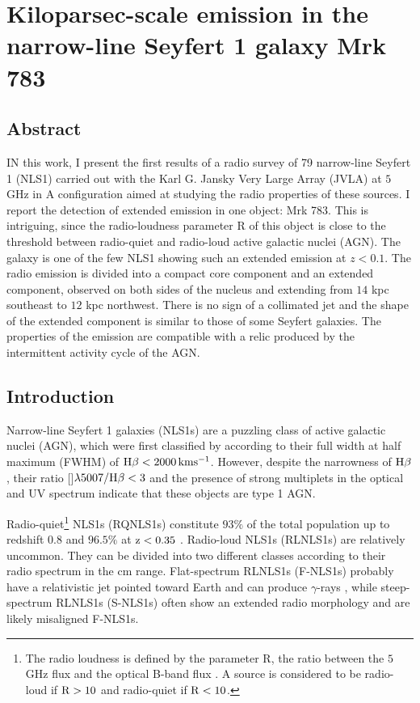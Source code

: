 \documentclass[../main.tex]{subfiles}
\begin{document}
\chapter[KSE in the NLS1 Mrk 783]{Kiloparsec-scale emission in the narrow-line Seyfert 1 galaxy Mrk 783}
\label{cap:paper2}

\section{Abstract}
IN this work, I present the first results of a radio survey of 79 narrow-line Seyfert 1 (NLS1) carried out with the Karl G. Jansky Very Large Array (JVLA) at $5$ GHz in A configuration aimed at studying the radio properties of these sources.
I report the detection of extended emission in one object: Mrk 783.
This is intriguing, since the radio-loudness parameter R of this object is close to the threshold between radio-quiet and radio-loud active galactic nuclei (AGN).
The galaxy is one of the few NLS1 showing such an extended emission at $z<0.1$.
The radio emission is divided into a compact core component and an extended component, observed on both sides of the nucleus and extending from $14$ kpc southeast to $12$ kpc northwest.
There is no sign of a collimated jet and the shape of the extended component is similar to those of some Seyfert galaxies.
The properties of the emission are compatible with a relic produced by the intermittent activity cycle of the AGN.

\section{Introduction}
Narrow-line Seyfert 1 galaxies (NLS1s) are a puzzling class of active galactic nuclei (AGN), which were first classified by \citet{Osterbrock85} according to their full width at half maximum (FWHM) of $\rm H\beta < 2000\,km s^{-1}$. 
However, despite the narrowness of $\rm H\beta$, their ratio []$\lambda5007/\rm H\beta< 3$ and the presence of strong  multiplets in the optical and UV spectrum indicate that these objects are type 1 AGN. 

Radio-quiet\footnote{The radio loudness is defined by the parameter R, the ratio between the $5$ GHz flux and the optical B-band flux \citep{Kellermann89}. A source is considered to be radio-loud if $\rm R>10$ and radio-quiet if $\rm R <10$.} NLS1s (RQNLS1s) constitute $93\%$ of the total population up to redshift $0.8$ \citep{Komossa06} and $96.5\%$ at $\rm z<0.35$ \citep{Cracco16}.
Radio-loud NLS1s (RLNLS1s) are relatively uncommon.
They can be divided into two different classes according to their radio spectrum in the cm range.
Flat-spectrum RLNLS1s (F-NLS1s) probably have a relativistic jet pointed toward Earth and can produce $\gamma$-rays \citep{Abdo09a, Abdo09b}, while steep-spectrum RLNLS1s (S-NLS1s) often show an extended radio morphology and are likely misaligned F-NLS1s. 
\end{document}
